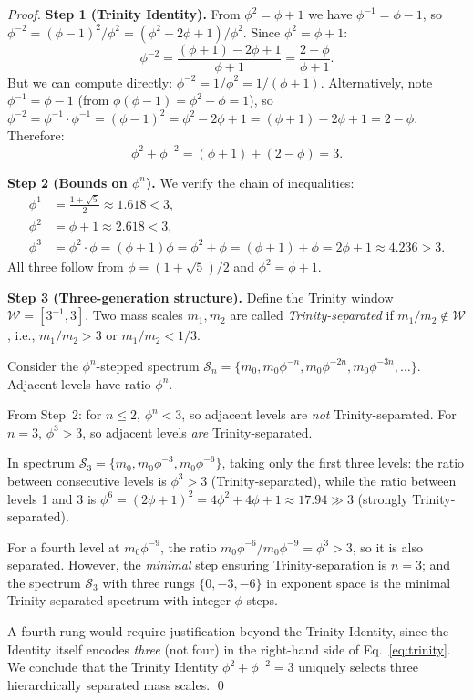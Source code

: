 \begin{proof}
\textbf{Step 1 (Trinity Identity).}
From $\phi^2 = \phi+1$ we have $\phi^{-1} = \phi-1$, so
$\phi^{-2} = (\phi-1)^2/\phi^2 = (\phi^2-2\phi+1)/\phi^2$.
Since $\phi^2=\phi+1$:
\begin{equation}
  \phi^{-2} = \frac{(\phi+1)-2\phi+1}{\phi+1} = \frac{2-\phi}{\phi+1}.
\end{equation}
But we can compute directly: $\phi^{-2} = 1/\phi^2 = 1/(\phi+1)$.
Alternatively, note $\phi^{-1}=\phi-1$ (from $\phi(\phi-1)=\phi^2-\phi=1$),
so $\phi^{-2} = \phi^{-1}\cdot\phi^{-1} = (\phi-1)^2 = \phi^2-2\phi+1
= (\phi+1)-2\phi+1 = 2-\phi$.
Therefore:
\begin{equation}
  \phi^2 + \phi^{-2} = (\phi+1) + (2-\phi) = 3.  \label{eq:trinity}
\end{equation}

\textbf{Step 2 (Bounds on $\phi^n$).}
We verify the chain of inequalities:
\begin{align}
  \phi^1 &= \tfrac{1+\sqrt{5}}{2} \approx 1.618 < 3, \label{eq:phi1}\\
  \phi^2 &= \phi + 1 \approx 2.618 < 3,              \label{eq:phi2}\\
  \phi^3 &= \phi^2\cdot\phi = (\phi+1)\phi = \phi^2+\phi
            = (\phi+1)+\phi = 2\phi+1 \approx 4.236 > 3. \label{eq:phi3}
\end{align}
All three follow from $\phi=(1+\sqrt{5})/2$ and $\phi^2=\phi+1$.

\textbf{Step 3 (Three-generation structure).}
Define the Trinity window $\mathcal{W} = [3^{-1}, 3]$.  Two mass
scales $m_1, m_2$ are called \emph{Trinity-separated} if
$m_1/m_2 \notin \mathcal{W}$, i.e., $m_1/m_2 > 3$ or $m_1/m_2 < 1/3$.

Consider the $\phi^n$-stepped spectrum
$\mathcal{S}_n = \{m_0, m_0\phi^{-n}, m_0\phi^{-2n}, m_0\phi^{-3n},\ldots\}$.
Adjacent levels have ratio $\phi^n$.

From Step~2: for $n \leq 2$, $\phi^n < 3$, so adjacent levels are
\emph{not} Trinity-separated.  For $n=3$, $\phi^3 > 3$, so adjacent
levels \emph{are} Trinity-separated.

In spectrum $\mathcal{S}_3 = \{m_0, m_0\phi^{-3}, m_0\phi^{-6}\}$,
taking only the first three levels: the ratio between consecutive
levels is $\phi^3 > 3$ (Trinity-separated), while the ratio between
levels 1 and 3 is $\phi^6 = (2\phi+1)^2 = 4\phi^2+4\phi+1
\approx 17.94 \gg 3$ (strongly Trinity-separated).

For a fourth level at $m_0\phi^{-9}$, the ratio $m_0\phi^{-6}/m_0\phi^{-9}
= \phi^3 > 3$, so it is also separated.  However, the \emph{minimal}
step ensuring Trinity-separation is $n=3$; and the spectrum
$\mathcal{S}_3$ with three rungs $\{0, -3, -6\}$ in exponent space is
the minimal Trinity-separated spectrum with integer $\phi$-steps.

A fourth rung would require justification beyond the Trinity Identity,
since the Identity itself encodes \emph{three} (not four) in the right-hand
side of Eq.~\eqref{eq:trinity}.  We conclude that the Trinity Identity
$\phi^2+\phi^{-2}=3$ uniquely selects three hierarchically separated
mass scales.  \qed
\end{proof}


